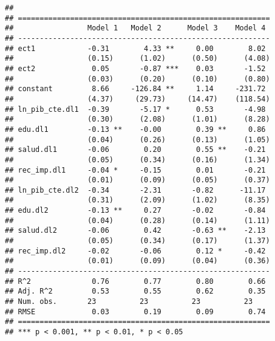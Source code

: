 \documentclass[]{book}
\newenvironment{Shaded}{\begin{snugshade}}{\end{snugshade}}
\newcommand{\KeywordTok}[1]{\textcolor[rgb]{0.13,0.29,0.53}{\textbf{#1}}}
\newcommand{\DecValTok}[1]{\textcolor[rgb]{0.00,0.00,0.81}{#1}}
\newcommand{\StringTok}[1]{\textcolor[rgb]{0.31,0.60,0.02}{#1}}
\newcommand{\OperatorTok}[1]{\textcolor[rgb]{0.81,0.36,0.00}{\textbf{#1}}}
\newcommand{\NormalTok}[1]{#1}
\theoremstyle{definition}
\theoremstyle{definition}
\theoremstyle{definition}
\theoremstyle{remark}
\begin{document}
\begin{Shaded}
\end{Shaded}

\begin{verbatim}
## 
## ==========================================================
##                 Model 1   Model 2      Model 3    Model 4 
## ----------------------------------------------------------
## ect1            -0.31        4.33 **     0.00        8.02 
##                 (0.15)      (1.02)      (0.50)      (4.08)
## ect2             0.05       -0.87 ***    0.03       -1.52 
##                 (0.03)      (0.20)      (0.10)      (0.80)
## constant         8.66     -126.84 **     1.14     -231.72 
##                 (4.37)     (29.73)     (14.47)    (118.54)
## ln_pib_cte.dl1  -0.39       -5.17 *      0.53       -4.98 
##                 (0.30)      (2.08)      (1.01)      (8.28)
## edu.dl1         -0.13 **    -0.00        0.39 **     0.86 
##                 (0.04)      (0.26)      (0.13)      (1.05)
## salud.dl1       -0.06        0.20        0.55 **    -0.21 
##                 (0.05)      (0.34)      (0.16)      (1.34)
## rec_imp.dl1     -0.04 *     -0.15        0.01       -0.21 
##                 (0.01)      (0.09)      (0.05)      (0.37)
## ln_pib_cte.dl2  -0.34       -2.31       -0.82      -11.17 
##                 (0.31)      (2.09)      (1.02)      (8.35)
## edu.dl2         -0.13 **     0.27       -0.02       -0.84 
##                 (0.04)      (0.28)      (0.14)      (1.11)
## salud.dl2       -0.06        0.42       -0.63 **    -2.13 
##                 (0.05)      (0.34)      (0.17)      (1.37)
## rec_imp.dl2     -0.02       -0.06        0.12 *     -0.42 
##                 (0.01)      (0.09)      (0.04)      (0.36)
## ----------------------------------------------------------
## R^2              0.76        0.77        0.80        0.66 
## Adj. R^2         0.53        0.55        0.62        0.35 
## Num. obs.       23          23          23          23    
## RMSE             0.03        0.19        0.09        0.74 
## ==========================================================
## *** p < 0.001, ** p < 0.01, * p < 0.05
\end{verbatim}
\end{document}

